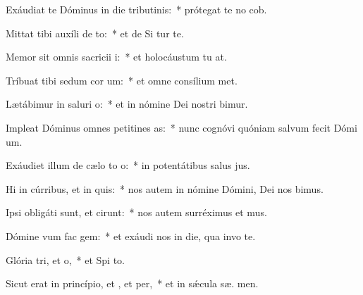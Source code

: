 \item Exáudiat te Dóminus in die tributinis:~* prótegat te no  cob.
\item Mittat tibi auxíli de to:~* et de Si tur te.
\item Memor sit omnis sacricii i:~* et holocáustum tu  at.
\item Tríbuat tibi sedum cor um:~* et omne consílium  met.
\item Lætábimur in saluri o:~* et in nómine Dei nostri bimur.
\item Impleat Dóminus omnes petitines as:~* nunc cognóvi quóniam salvum fecit Dómi  um.
\item Exáudiet illum de cælo to o:~* in potentátibus salus  jus.
\item Hi in cúrribus, et  in quis:~* nos autem in nómine Dómini, Dei nos bimus.
\item Ipsi obligáti sunt, et cirunt:~* nos autem surréximus et  mus.
\item Dómine vum fac gem:~* et exáudi nos in die, qua invo te.
\item Glória tri, et o,~* et Spi to.
\item Sicut erat in princípio, et , et per,~* et in sǽcula sæ. men.
